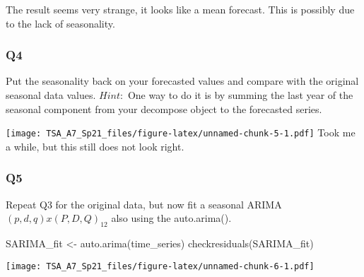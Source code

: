 \documentclass[
]{article}
\newenvironment{Shaded}{\begin{snugshade}}{\end{snugshade}}
\newcommand{\AttributeTok}[1]{\textcolor[rgb]{0.77,0.63,0.00}{#1}}
\newcommand{\ConstantTok}[1]{\textcolor[rgb]{0.00,0.00,0.00}{#1}}
\newcommand{\DecValTok}[1]{\textcolor[rgb]{0.00,0.00,0.81}{#1}}
\newcommand{\FunctionTok}[1]{\textcolor[rgb]{0.00,0.00,0.00}{#1}}
\newcommand{\NormalTok}[1]{#1}
\newcommand{\OtherTok}[1]{\textcolor[rgb]{0.56,0.35,0.01}{#1}}
\newcommand{\SpecialCharTok}[1]{\textcolor[rgb]{0.00,0.00,0.00}{#1}}
\newcommand{\StringTok}[1]{\textcolor[rgb]{0.31,0.60,0.02}{#1}}
\begin{document}
The result seems very strange, it looks like a mean forecast. This is
possibly due to the lack of seasonality.

\hypertarget{q4}{%
\subsubsection{Q4}\label{q4}}

Put the seasonality back on your forecasted values and compare with the
original seasonal data values. \(Hint:\) One way to do it is by summing
the last year of the seasonal component from your decompose object to
the forecasted series.

\begin{Shaded}
\end{Shaded}

\texttt{[image: TSA\_A7\_Sp21\_files/figure-latex/unnamed-chunk-5-1.pdf]}
Took me a while, but this still does not look right.

\hypertarget{q5}{%
\subsubsection{Q5}\label{q5}}

Repeat Q3 for the original data, but now fit a seasonal
ARIMA\((p,d,q)x(P,D,Q)_ {12}\) also using the auto.arima().

\begin{Shaded}
\begin{Highlighting}[]
\NormalTok{SARIMA\_fit }\OtherTok{\textless{}{-}} \FunctionTok{auto.arima}\NormalTok{(time\_series)}
\FunctionTok{checkresiduals}\NormalTok{(SARIMA\_fit)}
\end{Highlighting}
\end{Shaded}

\texttt{[image: TSA\_A7\_Sp21\_files/figure-latex/unnamed-chunk-6-1.pdf]}
\end{document}
